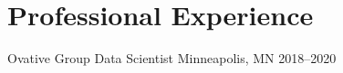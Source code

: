 \section{Professional Experience}

\cventry
  {Ovative Group}
  {Data Scientist}
  {Minneapolis, MN}
  {2018--2020}
  {}
